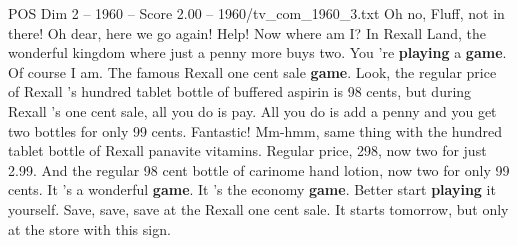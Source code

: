 \begin{textsample}{POS Dim 2 – 1960 – Score 2.00 – 1960/tv\_com\_1960\_3.txt}  \label{ex:f2_pos_030}
Oh no, Fluff, not in there!
Oh dear, here we go again!
Help!
Now where am I?
In Rexall Land, the wonderful kingdom where just a penny more buys two.
You 're \textbf{playing} a \textbf{game}.
Of course I am.
The famous Rexall one cent sale \textbf{game}.
Look, the regular price of Rexall 's hundred tablet bottle of buffered aspirin is 98 cents, but during Rexall 's one cent sale, all you do is pay.
All you do is add a penny and you get two bottles for only 99 cents.
Fantastic!
Mm-hmm, same thing with the hundred tablet bottle of Rexall panavite vitamins.
Regular price, 298, now two for just 2.99.
And the regular 98 cent bottle of carinome hand lotion, now two for only 99 cents.
It 's a wonderful \textbf{game}.
It 's the economy \textbf{game}.
Better start \textbf{playing} it yourself.
Save, save, save at the Rexall one cent sale.
It starts tomorrow, but only at the store with this sign.

\end{textsample}
